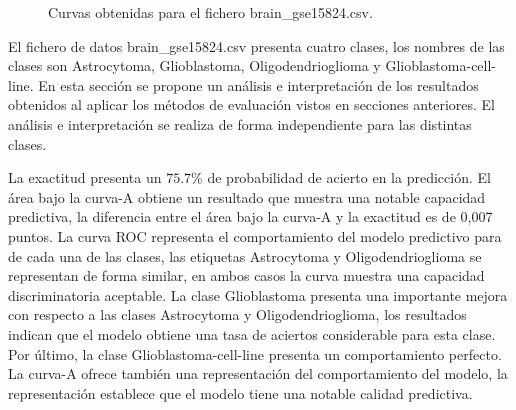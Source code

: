 \bigbreak

\begin{figure}[htp]
    \centering
    \caption{Curvas obtenidas para el fichero brain\_gse15824.csv.}
    \label{fig:10}
\end{figure}

\bigbreak

El fichero de datos brain\_gse15824.csv presenta cuatro clases, los nombres de las clases son Astrocytoma, Glioblastoma, Oligodendrioglioma y Glioblastoma-cell-line. En esta sección se propone un análisis e interpretación de los resultados obtenidos al aplicar los métodos de evaluación vistos en secciones anteriores. El análisis e interpretación se realiza de forma independiente para las distintas clases.

\bigbreak

La exactitud presenta un $75.7$\% de probabilidad de acierto en la predicción. El área bajo la curva-A obtiene un resultado que muestra una notable capacidad predictiva, la diferencia entre el área bajo la curva-A y la exactitud es de 0,007 puntos. La curva ROC representa el comportamiento del modelo predictivo para de cada una de las clases, las etiquetas Astrocytoma y Oligodendrioglioma se representan de forma similar, en ambos casos la curva muestra una capacidad discriminatoria aceptable. La clase Glioblastoma presenta una importante mejora con respecto a las clases Astrocytoma y Oligodendrioglioma, los resultados indican que el modelo obtiene una tasa de aciertos considerable para esta clase. Por último, la clase Glioblastoma-cell-line presenta un comportamiento perfecto. La curva-A ofrece también una representación del comportamiento del modelo, la representación establece que el modelo tiene una notable calidad predictiva.

\bigbreak

